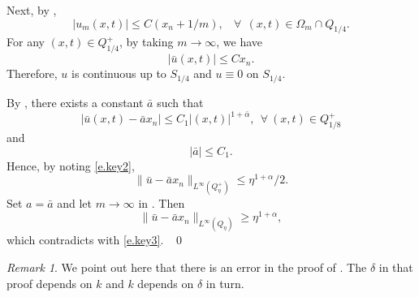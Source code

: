 \documentclass[preprint,12pt]{elsarticle}
\theoremstyle{definition}
\theoremstyle{remark}
\newtheorem{remark}[theorem]{Remark}
\numberwithin{equation}{section}
\begin{document}
Next, by ,
\begin{equation*}
|u_m(x,t)|\leq C(x_n+1/m),~~~~\forall ~~(x,t) \in \Omega_m\cap Q_{1/4}.
\end{equation*}
For any $(x,t)\in Q^+_{1/4}$, by taking $m\rightarrow \infty$, we have
\begin{equation*}
  |\bar u(x,t)|\leq Cx_n.
\end{equation*}
Therefore, $u$ is continuous up to $S_{1/4}$ and $u\equiv 0$ on $S_{1/4}$.


By , there exists a constant $\bar{a}$ such that
\begin{equation*}
  |\bar u(x,t)-\bar{a}x_n|\leq C_1 |(x,t)|^{1+\bar{\alpha}}, ~~\forall ~(x,t)\in Q_{1/8}^+
\end{equation*}
and
\begin{equation*}
  |\bar{a}|\leq C_1.
\end{equation*}
Hence, by noting \cref{e.key2},
\begin{equation}\label{e.key3}
  \|\bar u-\bar{a}x_n\|_{L^{\infty}(Q_{\eta}^+)}\leq \eta^{1+\alpha}/2.
\end{equation}
Set $a=\bar{a}$ and let $m\rightarrow \infty$ in . Then
\begin{equation*}
    \|\bar u-\bar{a}x_n\|_{L^{\infty}(Q_{\eta})}\geq \eta^{1+\alpha},
\end{equation*}
which contradicts with \cref{e.key3}.  ~\qed~\\

\begin{remark}\label{re.closed.1}
We point out here that there is an error in the proof of \cite[Lemma 2.8]{MR4088470}. The $\delta$ in that proof depends on $k$ and $k$ depends on $\delta$ in turn.
\end{remark}
\end{document}
